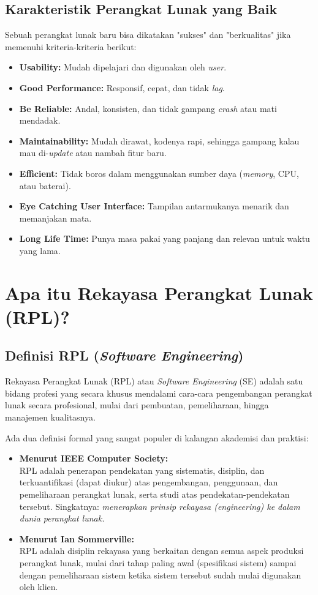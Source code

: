 \documentclass[12pt,a4paper]{article}
\begin{document}
\subsection{Karakteristik Perangkat Lunak yang Baik}
Sebuah perangkat lunak baru bisa dikatakan "sukses" dan "berkualitas" jika memenuhi kriteria-kriteria berikut:
\begin{itemize}
    \item \textbf{Usability:} Mudah dipelajari dan digunakan oleh \textit{user}.
    \item \textbf{Good Performance:} Responsif, cepat, dan tidak \textit{lag}.
    \item \textbf{Be Reliable:} Andal, konsisten, dan tidak gampang \textit{crash} atau mati mendadak.
    \item \textbf{Maintainability:} Mudah dirawat, kodenya rapi, sehingga gampang kalau mau di-\textit{update} atau nambah fitur baru.
    \item \textbf{Efficient:} Tidak boros dalam menggunakan sumber daya (\textit{memory}, CPU, atau baterai).
    \item \textbf{Eye Catching User Interface:} Tampilan antarmukanya menarik dan memanjakan mata.
    \item \textbf{Long Life Time:} Punya masa pakai yang panjang dan relevan untuk waktu yang lama.
\end{itemize}

\newpage
\section{Apa itu Rekayasa Perangkat Lunak (RPL)?}

\subsection{Definisi RPL (\textit{Software Engineering})}
Rekayasa Perangkat Lunak (RPL) atau \textit{Software Engineering} (SE) adalah satu bidang profesi yang secara khusus mendalami cara-cara pengembangan perangkat lunak secara profesional, mulai dari pembuatan, pemeliharaan, hingga manajemen kualitasnya.

Ada dua definisi formal yang sangat populer di kalangan akademisi dan praktisi:
\begin{itemize}
    \item \textbf{Menurut IEEE Computer Society:}\\
    RPL adalah penerapan pendekatan yang sistematis, disiplin, dan terkuantifikasi (dapat diukur) atas pengembangan, penggunaan, dan pemeliharaan perangkat lunak, serta studi atas pendekatan-pendekatan tersebut. Singkatnya: \textit{menerapkan prinsip rekayasa (engineering) ke dalam dunia perangkat lunak.}
    \item \textbf{Menurut Ian Sommerville:}\\
    RPL adalah disiplin rekayasa yang berkaitan dengan semua aspek produksi perangkat lunak, mulai dari tahap paling awal (spesifikasi sistem) sampai dengan pemeliharaan sistem ketika sistem tersebut sudah mulai digunakan oleh klien.
\end{itemize}
\end{document}
